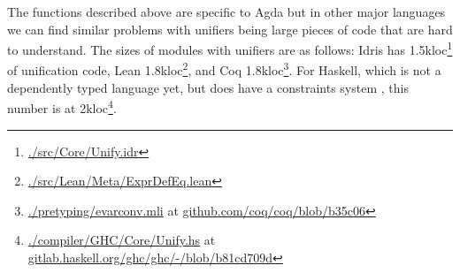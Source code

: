\begin{imageonly}
\begin{Shaded}
\begin{Highlighting}[]
\NormalTok{  (}\OperatorTok{|}\OperatorTok{==}\OtherTok{{-}\textgreater{}} \NormalTok{ ()}
\NormalTok{  (}\OperatorTok{|}\OperatorTok{==}\OtherTok{{-}\textgreater{}} 
\OtherTok{\textless{}{-}}
\NormalTok{  (}\OperatorTok{|}\OperatorTok{==}\OtherTok{{-}\textgreater{}} 
\OtherTok{\textless{}{-}}
\end{Highlighting}
\end{Shaded}
\end{imageonly}

The functions described above are specific to Agda but in other major
languages we can find similar problems with unifiers being large pieces
of code that are hard to understand. The sizes of modules with unifiers
are as follows: Idris has 1.5kloc\footnote{\href{https://github.com/idris-lang/Idris2/blob/102d7ebc18a9e881021ed4b05186cccda5274cbe/src/Core/Unify.idr}{./src/Core/Unify.idr}}
of unification code, Lean 1.8kloc\footnote{\href{https://github.com/leanprover/lean4/blob/75252d2b85df8cb9231020a556a70f6d736e7ee5/src/Lean/Meta/ExprDefEq.lean}{./src/Lean/Meta/ExprDefEq.lean}},
and Coq 1.8kloc\footnote{\href{https://github.com/coq/coq/blob/b35c06c3ab3ed4911311b4a9428a749658d3eff1/pretyping/evarconv.mli}{./pretyping/evarconv.mli}
  at
  \href{github.com/coq/coq/blob/b35c06c3ab3ed4911311b4a9428a749658d3eff1/}{github.com/coq/coq/blob/b35c06}}.
For Haskell, which is not a dependently typed language yet, but does
have a constraints system
\citep{peytonjonesTypeInferenceConstraint2019}, this number is at
2kloc\footnote{\href{https://gitlab.haskell.org/ghc/ghc/-/blob/b81cd709df8054b8b98ac05d3b9affcee9a8b840/compiler/GHC/Core/Unify.hs}{./compiler/GHC/Core/Unify.hs}
  at\\
  \href{https://gitlab.haskell.org/ghc/ghc/-/blob/b81cd709df8054b8b98ac05d3b9affcee9a8b840}{gitlab.haskell.org/ghc/ghc/-/blob/b81cd709d}}.


